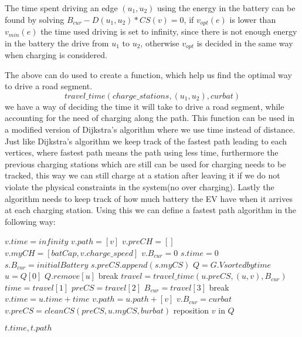 The time spent driving an edge $(u_1, u_2)$ using the energy in the battery can be found by solving $B_{cur} - D(u_1, u_2) * CS(v) = 0$, if $v_{opt}(e)$ is lower than $v_{min}(e)$ the time used driving is set to infinity, since there is not enough energy in the battery the drive from $u_1$ to $u_2$, otherwise $v_{opt}$ is decided in the same way when charging is considered.   

The above can do used to create a function, which help us find the optimal way to drive a road segment. 
\[travel\_time(charge\_stations, (u_1, u_2), curbat) \]
we have a way of deciding the time it will take to drive a road segment, while accounting for the need of charging along the path. This function can be used in a modified version of Dijkstra's algorithm where we use time instead of distance. Just like Dijkstra's algorithm we keep track of the fastest path leading to each vertices, where fastest path means the path using less time, furthermore the previous charging stations which are still can be used for charging needs to be tracked, this way we can still charge at a station after leaving it if we do not violate the physical constraints in the system(no over charging). Lastly the algorithm needs to keep track of how much battery the EV have when it arrives at each charging station. Using this we can define a fastest path algorithm in the following way: 

\begin{algorithmic}
    		\State $v.time = infinity$
		\State $v.path = [v]$
    		\State $v.preCH = []$
		\State $v.myCH = [batCap, v.charge\_speed]$
		\State $v.B_{cur} = 0$
    	\EndFor
	\State $s.time = 0$
	\State $s.B_{cur} = initialBattery$
	\State $s.preCS.append(s.myCS)$	
	\State $Q = G.V sorted by time$
		\State $u = Q[0]$
		\State $Q.remove[u]$
		 break \EndIf
			\State $travel = travel\_time(u.preCS, (u, v), B_{cur})$
			\State $time = travel[1]$
			\State $preCS = travel[2]$
			\State $B_{cur} = travel[3]$
			 break \EndIf
				\State $v.time = u.time + time$
				\State $v.path = u.path + [v]$
				\State $v.B_{cur} = curbat$
				\State $v.preCS = cleanCS(preCS, u.myCS, burbat)$
				\State reposition $v$ in $Q$
			\EndIf

		\EndFor
	\EndWhile
	\State \Return $t.time, t.path$
\EndFunction
\end{algorithmic}\label{alg:fastest_path}
